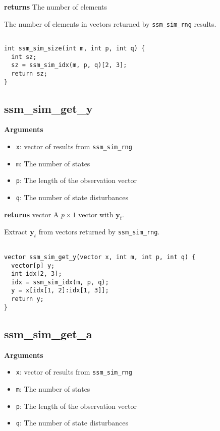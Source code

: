 \documentclass[]{book}
\providecommand{\tightlist}{%
  \setlength{\itemsep}{0pt}\setlength{\parskip}{0pt}}
\renewcommand{\vec}[1]{\boldsymbol{#1}}
\begin{document}
\textbf{returns} The number of elements

The number of elements in vectors returned by \texttt{ssm\_sim\_rng}
results.

\begin{verbatim}

int ssm_sim_size(int m, int p, int q) {
  int sz;
  sz = ssm_sim_idx(m, p, q)[2, 3];
  return sz;
}

\end{verbatim}

\subsection{ssm\_sim\_get\_y}\label{ssm_sim_get_y}

\textbf{Arguments}

\begin{itemize}
\tightlist
\item
  \texttt{x}: vector of results from \texttt{ssm\_sim\_rng}
\item
  \texttt{m}: The number of states
\item
  \texttt{p}: The length of the observation vector
\item
  \texttt{q}: The number of state disturbances
\end{itemize}

\textbf{returns} vector A \(p \times 1\) vector with \(\vec{y}_t\).

Extract \(\vec{y}_t\) from vectors returned by \texttt{ssm\_sim\_rng}.

\begin{verbatim}

vector ssm_sim_get_y(vector x, int m, int p, int q) {
  vector[p] y;
  int idx[2, 3];
  idx = ssm_sim_idx(m, p, q);
  y = x[idx[1, 2]:idx[1, 3]];
  return y;
}

\end{verbatim}

\subsection{ssm\_sim\_get\_a}\label{ssm_sim_get_a}

\textbf{Arguments}

\begin{itemize}
\tightlist
\item
  \texttt{x}: vector of results from \texttt{ssm\_sim\_rng}
\item
  \texttt{m}: The number of states
\item
  \texttt{p}: The length of the observation vector
\item
  \texttt{q}: The number of state disturbances
\end{itemize}
\end{document}
